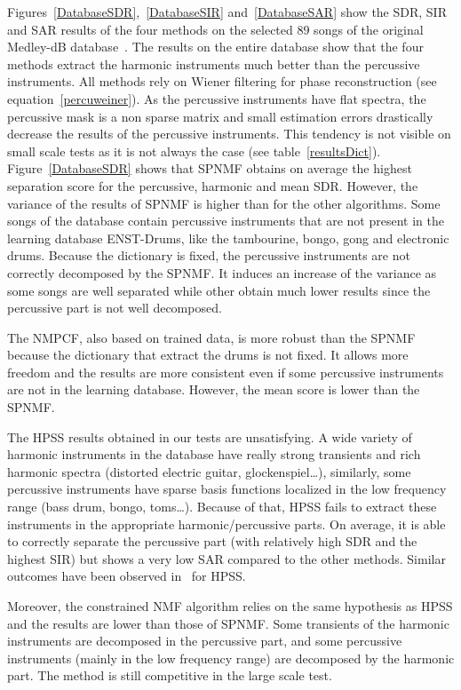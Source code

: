 Figures~\ref{DatabaseSDR},~\ref{DatabaseSIR} and~\ref{DatabaseSAR} show the SDR, SIR and SAR results of the four methods on the selected $89$ songs of the original Medley-dB database~\cite{bittner2014medleydb}. The results on the entire database show that the four methods extract the harmonic instruments much better than the percussive instruments. All methods rely on Wiener filtering for phase reconstruction (see equation~\ref{percuweiner}). As the percussive instruments have flat spectra, the percussive mask is a non sparse matrix and small estimation errors drastically decrease the results of the percussive instruments. This tendency is not visible on small scale tests as it is not always the case (see table~\ref{resultsDict}). 
Figure~\ref{DatabaseSDR} shows that SPNMF obtains on average the highest separation score for the percussive, harmonic and mean SDR. However, the variance of the results of SPNMF is higher than for the other algorithms. Some songs of the database contain percussive instruments that are not present in the learning database ENST-Drums, like the tambourine, bongo, gong and electronic drums. Because the dictionary is fixed, the percussive instruments are not correctly decomposed by the SPNMF. It induces an increase of the variance as some songs are well separated while other obtain much lower results since the percussive part is not well decomposed.

The NMPCF, also based on trained data, is more robust than the SPNMF because the dictionary that extract the drums is not fixed. It allows more freedom and the results are more consistent even if some percussive instruments are not in the learning database. However, the mean score is lower than the SPNMF.

The HPSS results obtained in our tests are unsatisfying. A wide variety of harmonic instruments in the database have really strong transients and rich harmonic spectra (distorted electric guitar, glockenspiel\ldots), similarly, some percussive instruments have sparse basis functions localized in the low frequency range (bass drum, bongo, toms\ldots). Because of that, HPSS fails to extract these instruments in the appropriate harmonic/percussive parts. On average, it is able to correctly separate the percussive part (with relatively high SDR and the highest SIR) but shows a very low SAR compared to the other methods. Similar outcomes have been observed in~\cite{canadas2014percussive} for HPSS.

Moreover, the constrained NMF algorithm relies on the same hypothesis as HPSS and the results are lower than those of SPNMF. Some transients of the harmonic instruments are decomposed in the percussive part, and some percussive instruments (mainly in the low frequency range) are decomposed by the harmonic part. The method is still competitive in the large scale test. 

